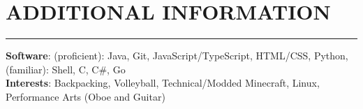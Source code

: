 \documentclass[10.5pt]{article}
\begin{document}
 \vspace{-\baselineskip}
\section*{\large\textbf{ADDITIONAL INFORMATION}}
\vspace{-\baselineskip}
\noindent\rule{\textwidth}{0.4pt}

\noindent
\textbf{Software}: (proficient): Java, Git, JavaScript/TypeScript, HTML/CSS, Python, (familiar): Shell, C, C\#, Go\\ 
\noindent
\textbf{Interests}: Backpacking, Volleyball, Technical/Modded Minecraft, Linux, Performance Arts (Oboe and Guitar)\\ 
\end{document}
